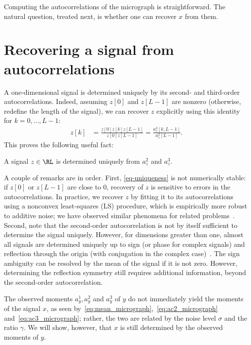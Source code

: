 \documentclass[9pt,twocolumn,twoside,lineno]{pnas-new}
\begin{document}
Computing the autocorrelations of the micrograph is straightforward. The natural question, treated next, is whether one can recover $x$ from them.

\section{Recovering a signal from autocorrelations} \label{sec:recovery}

A one-dimensional signal is determined uniquely by its second- and third-order autocorrelations. Indeed, assuming $z[0]$ and $z[L-1]$ are nonzero (otherwise, redefine the length of the signal), we can recover $z$ explicitly using this identity for $k = 0, \ldots, L-1$:
%
\begin{align}
%
z[k] & = \frac{z[0]z[k]z[L-1]}{z[0]z[L-1]} = \frac{a_z^3[k,L-1]}{a_z^2[L-1]}.
\label{eq-uniqueness}
%
\end{align}
This proves the following useful fact:
\begin{proposition} \label{prop:uniqueness}
	 A signal $z\in\RL$ is determined uniquely from  $a_z^2$ and $a_z^3$.
\end{proposition}

A couple of remarks are in order. First, \eqref{eq-uniqueness} is not numerically stable: if $z[0]$ or $z[L-1]$ are close to 0, recovery of $z$ is sensitive to errors in the autocorrelations. In practice, we recover $z$ by fitting it to its autocorrelations using a nonconvex least-squares (LS) procedure, which is empirically more robust to additive noise; we have observed similar phenomena for related problems~\cite{bendory2017bispectrum,boumal2017heterogeneous,abbe2017multireference}.
Second, note that the second-order autocorrelation is not by itself sufficient to determine the signal uniquely. %
However, for dimensions greater than one, almost all signals are determined uniquely up to sign (or phase for complex signals) and reflection through the origin (with conjugation in the complex case)~\cite{hayes1982reconstruction}. %
The sign ambiguity can be resolved by the mean of the signal if it is not zero. However, determining the reflection symmetry still requires additional information, beyond the second-order autocorrelation.

The observed moments $a_y^1,a_y^2$ and $a_y^3$ of $y$ do not immediately yield the moments of the signal $x$, as seen by~\eqref{eq:mean_micrograph},~\eqref{eq:ac2_micrograph} and~\eqref{eq:ac3_micrograph}; rather, the two are related by the noise level $\sigma$ and the ratio $\gamma$. We will show, however, that $x$ is still determined by the observed moments of $y$.
%
\end{document}
